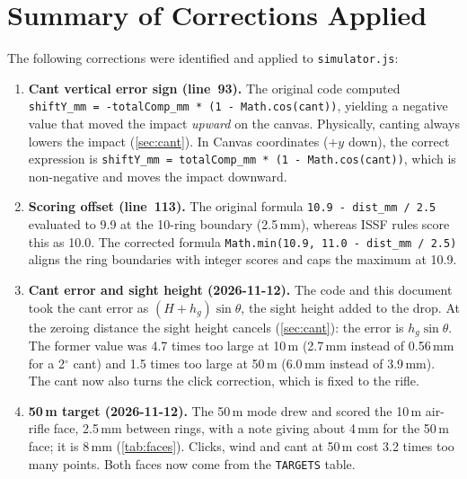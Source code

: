 \documentclass[11pt]{article}
\newcommand{\code}[1]{\texttt{#1}}
\newcommand{\file}[1]{\texttt{#1}}
\begin{document}
\section{Summary of Corrections Applied}\label{sec:errata}

The following corrections were identified and applied to
\file{simulator.js}:

\begin{enumerate}
  \item \textbf{Cant vertical error sign (line~93).}
    The original code computed
    \code{shiftY\_mm = -totalComp\_mm * (1 - Math.cos(cant))},
    yielding a negative value that moved the impact \emph{upward}
    on the canvas.  Physically, canting always lowers the impact
    (\cref{sec:cant}).  In Canvas coordinates ($+y$ down), the
    correct expression is
    \code{shiftY\_mm = totalComp\_mm * (1 - Math.cos(cant))},
    which is non-negative and moves the impact downward.

  \item \textbf{Scoring offset (line~113).}
    The original formula \code{10.9 - dist\_mm / 2.5} evaluated to
    9.9 at the 10-ring boundary (2.5\,mm), whereas ISSF rules score
    this as 10.0.  The corrected formula
    \code{Math.min(10.9, 11.0 - dist\_mm / 2.5)} aligns the ring
    boundaries with integer scores and caps the maximum at 10.9.

  \item \textbf{Cant error and sight height (2026-11-12).}
    The code and this document took the cant error as
    $(H + h_g)\sin\theta$, the sight height added to the drop.  At the
    zeroing distance the sight height cancels (\cref{sec:cant}): the
    error is $h_g\sin\theta$.  The former value was 4.7 times too large
    at 10\,m (2.7\,mm instead of 0.56\,mm for a 2$^\circ$ cant) and
    1.5 times too large at 50\,m (6.0\,mm instead of 3.9\,mm).  The
    cant now also turns the click correction, which is fixed to the
    rifle.

  \item \textbf{50\,m target (2026-11-12).}
    The 50\,m mode drew and scored the 10\,m air-rifle face, 2.5\,mm
    between rings, with a note giving about 4\,mm for the 50\,m face;
    it is 8\,mm (\cref{tab:faces}).  Clicks, wind and cant at 50\,m
    cost 3.2 times too many points.  Both faces now come from the
    \code{TARGETS} table.


\end{enumerate}
\end{document}
